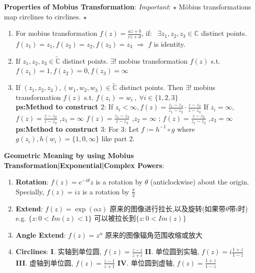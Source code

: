 \documentclass[9pt]{article}
\begin{document}
\textbf{Properties of Mobius Transformation}: \textit{Important}: $\star$ Möbius transformations map circlines to circlines. $\star$
\begin{enumerate}[itemsep=-2pt, topsep=-2pt]
    \item For mobius transformation $f(z)=\frac{az+b}{cz+d}$, if: \ $\exists z_1,z_2,z_3\in\mathbb{C}$ distinct points. $f(z_1)=z_1,f(z_2)=z_2,f(z_3)=z_3$ $\Rightarrow$ $f$ is identity.
    \item If $z_1,z_2,z_3\in\widetilde{\mathbb{C}}$ distinct points. \quad $\exists!$ mobius transformation $f(z)$ s.t. $f(z_1)=1,f(z_2)=0,f(z_3)=\infty$
    \item If $(z_1,z_2,z_3),(w_1,w_2,w_3)\in\widetilde{\mathbb{C}}$ distinct points. Then $\exists!$ mobius transformation $f(z)$ s.t. $f(z_i)=w_i \ , \ \forall i\in\{1,2,3\}$ \\
    \textbf{ps:Method to construct $2$}: If $z_i<\infty,f(z)=\frac{z_1-z_3}{z_1-z_2}\cdot\frac{z-z_2}{z-z_3}$ \qquad If $z_i=\infty$, {\footnotesize $f(z)=\frac{z-z_2}{z-z_3}$ {\scriptsize ,$z_1=\infty$} $f(z)=\frac{z_1-z_3}{z-z_3}$ {\scriptsize ,$z_2=\infty$} ; $f(z)=\frac{z-z_2}{z_1-z_2}$ {\scriptsize ,$z_3=\infty$} } \\
    \textbf{ps:Method to construct $3$}: For 3: Let $f:=h^{-1}\circ g$ {\footnotesize where $g(z_i),h(w_i)=\{1,0,\infty\}$ like part 2.}
    \vspace{1.5pt}
\end{enumerate}

\textbf{Geometric Meaning by using Mobius Transformation|Exponential|Complex Powers}:

\begin{enumerate}[itemsep=-2pt, topsep=-2pt]
    \item \textbf{Rotation}: $f(z)=e^{-i\theta}z$ is a rotation by $\theta$ (anticlockwise) about the origin. \qquad Specially, $f(z)=iz$ is a rotation by $\frac{\pi}{2}$
    \item \textbf{Extend}: $f(z)=\exp(\alpha z)$ {\small 原来的图像进行拉长,以及旋转(如果带$\theta$带$i$时)} e.g. $\{z:0<Im(z)<1\}$ {\small 可以被拉长到$\{z:0<Im(z)\}$}
    \item \textbf{Angle Extend}: $f(z)=z^{\alpha}$ {\small 原来的图像辐角范围收缩或放大}
    \item \textbf{Circlines}: {\small \textbf{I}. 实轴到单位圆, $f(z)=\frac{z-i}{z+i}$ \quad \textbf{II}. 单位圆到实轴, $f(z)=i\frac{1+z}{1-z}$ \textbf{III}. 虚轴到单位圆, $f(z)=\frac{z-1}{z+1}$ \quad \textbf{IV}. 单位圆到虚轴, $f(z)=\frac{1+z}{1-z}$}
\end{enumerate} 
\end{document}
